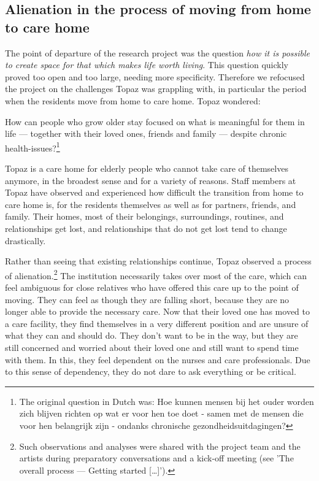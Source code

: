 \documentclass[authordate, empirical]{jote-new-article}
\begin{document}
	\subsection{Alienation in the process of moving from home to care home}



	The point of departure of the research project was the question \emph{how it is possible to create space for that which makes life worth living}. This question quickly proved too open and too large, needing more specificity. Therefore we refocused the project on the challenges Topaz was grappling with, in particular the period when the residents move from home to care home. Topaz wondered:







	How can people who grow older stay focused on what is meaningful for them in life — together with their loved ones, friends and family — despite chronic health-issues?\footnote{ The original question in Dutch was: Hoe kunnen mensen bij het ouder worden zich blijven richten op wat er voor hen toe doet - samen met de mensen die voor hen belangrijk zijn - ondanks chronische gezondheidsuitdagingen?}







	Topaz is a care home for elderly people who cannot take care of themselves anymore, in the broadest sense and for a variety of reasons. Staff members at Topaz have observed and experienced how difficult the transition from home to care home is, for the residents themselves as well as for partners, friends, and family. Their homes, most of their belongings, surroundings, routines, and relationships get lost, and relationships that do not get lost tend to change drastically.







	Rather than seeing that existing relationships continue, Topaz observed a process of alienation.\footnote{ Such observations and analyses were shared with the project team and the artists during preparatory conversations and a kick-off meeting (see 'The overall process --- Getting started […]').} The institution necessarily takes over most of the care, which can feel ambiguous for close relatives who have offered this care up to the point of moving. They can feel as though they are falling short, because they are no longer able to provide the necessary care. Now that their loved one has moved to a care facility, they find themselves in a very different position and are unsure of what they can and should do. They don't want to be in the way, but they are still concerned and worried about their loved one and still want to spend time with them. In this, they feel dependent on the nurses and care professionals. Due to this sense of dependency, they do not dare to ask everything or be critical.
\end{document}

